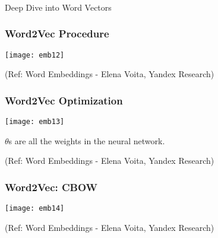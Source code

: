 \begin{frame}[fragile]\frametitle{}

\begin{center}
{\Large Deep Dive into Word Vectors}
\end{center}
\end{frame}


\begin{frame}[fragile]\frametitle{Word2Vec Procedure}
\begin{center}
\texttt{[image: emb12]}
\end{center}

{\tiny (Ref: Word Embeddings - Elena Voita, Yandex Research)}
\end{frame}

\begin{frame}[fragile]\frametitle{Word2Vec Optimization}
\begin{center}
\texttt{[image: emb13]}
\end{center}

$\theta$s are all the weights in the neural network.

{\tiny (Ref: Word Embeddings - Elena Voita, Yandex Research)}
\end{frame}




\begin{frame}[fragile]\frametitle{Word2Vec: CBOW}
\begin{center}
\texttt{[image: emb14]}
\end{center}

{\tiny (Ref: Word Embeddings - Elena Voita, Yandex Research)}
\end{frame}


